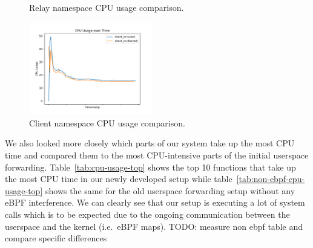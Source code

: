 \begin{figure}[H]
\begin{minipage}{0.48\textwidth}
        \caption[Relay CPU usage comparison]{Relay namespace CPU usage comparison.}\label{fig:cpu-utilization-relay}
    \end{minipage}\hfill
    \begin{minipage}{\textwidth}
        \centering
        \includegraphics[width=0.48\textwidth]{figures/04_testing_and_results/cpu_usage_client_ns.pdf}
        \caption[Client CPU usage comparison]{Client namespace CPU usage comparison.}\label{fig:cpu-utilization-client}
    \end{minipage}
\end{figure}

We also looked more closely which parts of our system take up the most CPU time and compared them
to the most CPU-intensive parts of the initial userspace forwarding.
Table~\ref{tab:cpu-usage-top} shows the top 10 functions that take up the most CPU time in our newly
developed setup while table~\ref{tab:non-ebpf-cpu-usage-top} shows the same for the old userspace 
forwarding setup without any eBPF interference. %
We can clearly see that our setup is executing a lot of system calls which is to be expected
due to the ongoing communication between the userspace and the kernel (i.e.~eBPF maps).
TODO: measure non ebpf table and compare specific differences 

